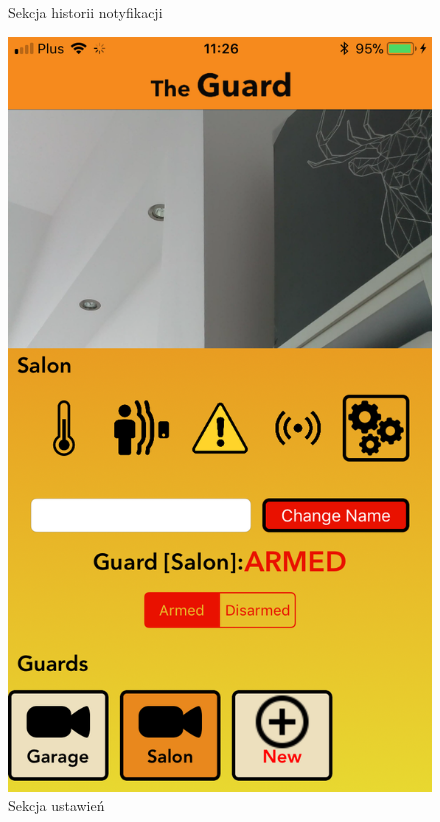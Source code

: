 \begin{figure}[h]
\begin{minipage}{.4\linewidth}
    \caption{Sekcja historii notyfikacji}
    \label{img1}
\end{minipage}
\hspace{.05\linewidth}
\begin{minipage}{.4\linewidth}
    \includegraphics[width=\linewidth]{settings.png}
    \caption{Sekcja ustawień}
    \label{img2}
\end{minipage}
\end{figure} 
